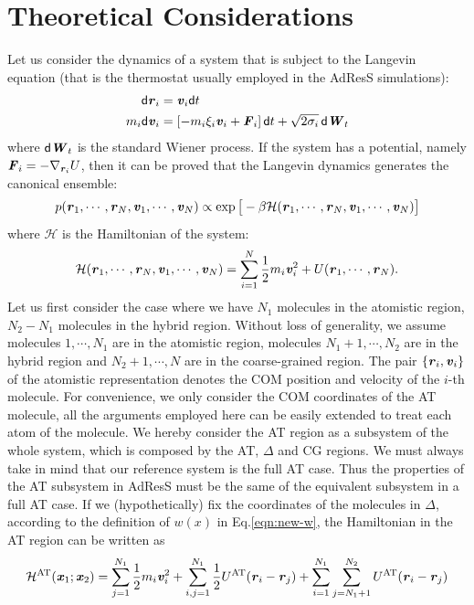\documentclass[aps,prb,preprint,citeautoscript]{revtex4}
\renewcommand{\v}[1]{\textbf{\textit{#1}}}
\renewcommand{\d}[1]{\textsf{#1}}
\begin{document}
\section{Theoretical Considerations}
Let us consider the dynamics of a system that is subject to the Langevin equation (that is the thermostat usually employed in the AdResS simulations):
\begin{align}
  \d d\v r_i &= \v v_i\d dt\\
  m_i\d d\v v_i &= [-m_i\xi_i\v v_i + \v F_i]\,\d dt + \sqrt{2\sigma_i}\,\d d\v W_t
\end{align}
where $\d d\v W_t$ is the standard Wiener process.  If the system has a
potential, namely $\v F_i = -\nabla_{\v r_i}U$, then it can be proved that the
Langevin dynamics generates the canonical ensemble:
\begin{align}
  p(\v r_1, \cdots, \v r_N, \v v_1, \cdots, \v v_N)
  \propto \exp\big[
  -\beta \mathcal H(\v r_1, \cdots, \v r_N, \v v_1, \cdots, \v v_N)
  \big]
\end{align}
where $\mathcal H$ is the Hamiltonian of the system:
\begin{align}
  \mathcal H(\v r_1, \cdots, \v r_N, \v v_1, \cdots, \v v_N)
  =
  \sum_{i=1}^N\frac12 m_i\v v_i^2 + U(\v r_1, \cdots, \v r_N).
\end{align}
Let us first consider the case where we have $N_1$
molecules in the atomistic region, $N_2 - N_1$ molecules in the hybrid
region.  Without loss of generality, we assume molecules $1, \cdots,
N_1$ are in the atomistic region, molecules $N_1 + 1, \cdots, N_2$ are
in the hybrid region and $N_2+1, \cdots, N$ are in the coarse-grained
region. The pair $\{\v r_i, \v v_i\}$ of the atomistic representation
denotes the COM position and velocity of the $i$-th
molecule. For convenience, we only consider the COM coordinates of the
AT molecule, all the arguments employed here
can be easily extended to treat each atom of the molecule.
We hereby consider the AT region as a subsystem of the whole
system, which is composed by the AT, $\Delta$ and CG
regions. We must always take in mind that our reference system is the full AT case.
Thus the properties of the AT subsystem in AdResS must be the same of the equivalent subsystem in a full AT case.
 If we (hypothetically) fix the coordinates of the molecules in $\Delta$, according to the definition of $w(x)$ in Eq.\ref{eqn:new-w}, the Hamiltonian in the AT region can be written as
\begin{align}\label{eqn:at-h}
  \mathcal H^{\textrm{AT}}(\v x_1; \v x_2) =
  \sum_{j=1}^{N_1}\frac12 m_i\v v_i^2 + 
  \sum_{i,j=1}^{N_1}\frac12 U^{\textrm{AT}}(\v r_i - \v r_j) + 
  \sum_{i=1}^{N_1}\sum_{j=N_1+1}^{N_2} U^{\textrm{AT}}(\v r_i - \v r_j) 
\end{align}
\end{document}
